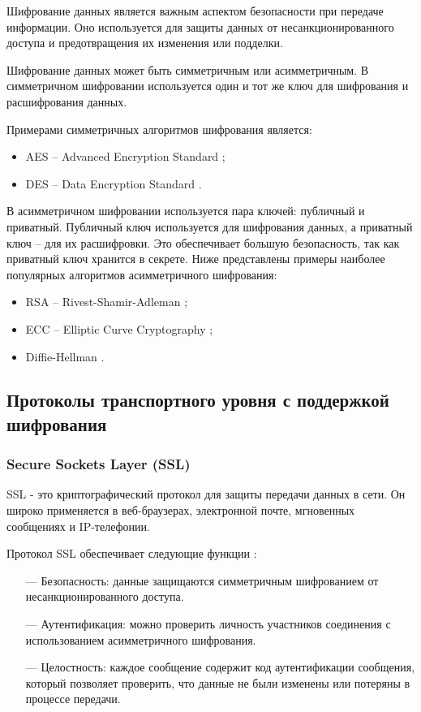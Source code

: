 Шифрование данных является важным аспектом безопасности при передаче информации. Оно используется для защиты данных от несанкционированного доступа и предотвращения их изменения или подделки.

Шифрование данных может быть симметричным или асимметричным. В симметричном шифровании используется один и тот же ключ для шифрования и расшифрования данных.

Примерами симметричных алгоритмов шифрования является:

\begin{itemize}
	\item AES -- Advanced Encryption Standard \cite{AES};
	\item DES -- Data Encryption Standard \cite{DES}.
\end{itemize}

В асимметричном шифровании используется пара ключей: публичный и приватный. Публичный ключ используется для шифрования данных, а приватный ключ -- для их расшифровки. Это обеспечивает большую безопасность, так как приватный ключ хранится в секрете. Ниже представлены примеры наиболее популярных алгоритмов асимметричного шифрования:

\begin{itemize}
	\item RSA -- Rivest-Shamir-Adleman \cite{RSA};
	\item ECC -- Elliptic Curve Cryptography \cite{RSA};
	\item Diffie-Hellman \cite{RSA}. 
\end{itemize}

\subsection{Протоколы транспортного уровня с поддержкой шифрования}

\subsubsection{Secure Sockets Layer (SSL)}

SSL - это криптографический протокол для защиты передачи данных в сети. Он широко применяется в веб-браузерах, электронной почте, мгновенных сообщениях и IP-телефонии.

Протокол SSL обеспечивает следующие функции \cite{ssl}:

\begin{itemize}
	\item [---] Безопасность: данные защищаются симметричным шифрованием от несанкционированного доступа.
	\item [---] Аутентификация: можно проверить личность участников соединения с использованием асимметричного шифрования.
	\item [---] Целостность: каждое сообщение содержит код аутентификации сообщения, который позволяет проверить, что данные не были изменены или потеряны в процессе передачи.
\end{itemize}

